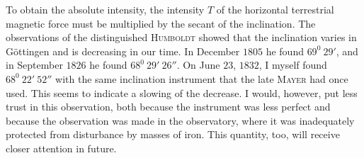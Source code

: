 To obtain the absolute intensity, the intensity $T$ of the horizontal terrestrial magnetic force must be multiplied by the secant of the inclination. The observations of the distinguished \textsc{Humboldt} showed that the inclination varies in Göttingen and is decreasing in our time. In December $1805$ he found $69^0\ 29'$, and in September $1826$ he found $68^0\ 29'\ 26''$. On June $23$, $1832$, I myself found $68^0\ 22'\ 52''$ with the same inclination instrument that the late \textsc{Mayer} had once used. This seems to indicate a slowing of the decrease. I would, however, put less trust in this observation, both because the instrument was less perfect and because the observation was made in the observatory, where it was inadequately protected from disturbance by masses of iron. This quantity, too, will receive closer attention in future.
